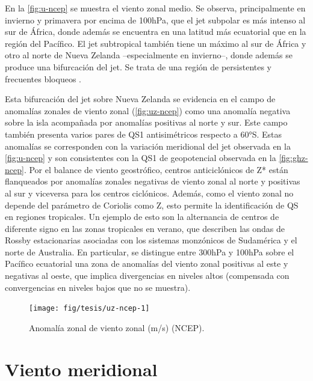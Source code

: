\documentclass[spanish,a4paper,12pt,oneside]{book}
\begin{document}
En la \autoref{fig:u-ncep} se muestra el viento zonal medio. Se observa,
principalmente en invierno y primavera por encima de 100hPa, que el jet
subpolar es más intenso al sur de África, donde además se encuentra en
una latitud más ecuatorial que en la región del Pacífico. El jet
subtropical también tiene un máximo al sur de África y otro al norte de
Nueva Zelanda --especialmente en invierno--, donde además se produce una
bifurcación del jet. Se trata de una región de persistentes y frecuentes
bloqueos \citep[ej.][]{Trenberth1985}.

Esta bifurcación del jet sobre Nueva Zelanda se evidencia en el campo de
anomalías zonales de viento zonal (\autoref{fig:uz-ncep}) como una
anomalía negativa sobre la isla acompañada por anomalías positivas al
norte y sur. Este campo también presenta varios pares de QS1
antisimétricos respecto a 60°S. Estas anomalías se corresponden con la
variación meridional del jet observada en la \autoref{fig:u-ncep} y son
consistentes con la QS1 de geopotencial observada en la
\autoref{fig:ghz-ncep}. Por el balance de viento geostrófico, centros
anticiclónicos de Z* están flanqueados por anomalías zonales negativas
de viento zonal al norte y positivas al sur y viceversa para los centros
ciclónicos. Además, como el viento zonal no depende del parámetro de
Coriolis como Z, esto permite la identificación de QS en regiones
tropicales. Un ejemplo de esto son la alternancia de centros de
diferente signo en las zonas tropicales en verano, que describen las
ondas de Rossby estacionarias asociadas con los sistemas monzónicos de
Sudamérica y el norte de Australia. En particular, se distingue entre
300hPa y 100hPa sobre el Pacífico ecuatorial una zona de anomalías del
viento zonal positivas al este y negativas al oeste, que implica
divergencias en niveles altos (compensada con convergencias en niveles
bajos que no se muestra).

\begin{landscape}\begin{figure}

{\centering \texttt{[image: fig/tesis/uz-ncep-1]} 

}

\caption{Anomalía zonal de viento zonal (m/s) (NCEP).}\label{fig:uz-ncep}
\end{figure}
\end{landscape}

\section{Viento meridional}\label{viento-meridional}
\end{document}
